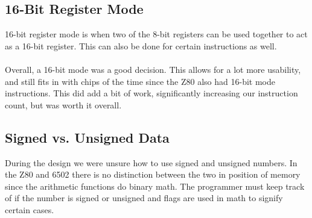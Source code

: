 \documentclass[conference]{IEEEtran}
\begin{document}
\subsection{16-Bit Register Mode}
16-bit register mode is when two of the 8-bit registers can be used together to act as a 16-bit register. This can also be done for certain instructions as well.\\

\\

Overall, a 16-bit mode was a good decision. This allows for a lot more usability, and still fits in with chips of the time since the Z80 also had 16-bit mode instructions. This did add a bit of work, significantly increasing our instruction count,  but was worth it overall.

\subsection{Signed vs. Unsigned Data}

During the design we were unsure how to use signed and unsigned numbers. In the Z80 and 6502 there is no distinction between the two in position of memory since the arithmetic functions do binary math. The programmer must keep track of if the number is signed or unsigned and flags are used in math to signify certain cases.\\

\\
\end{document}
